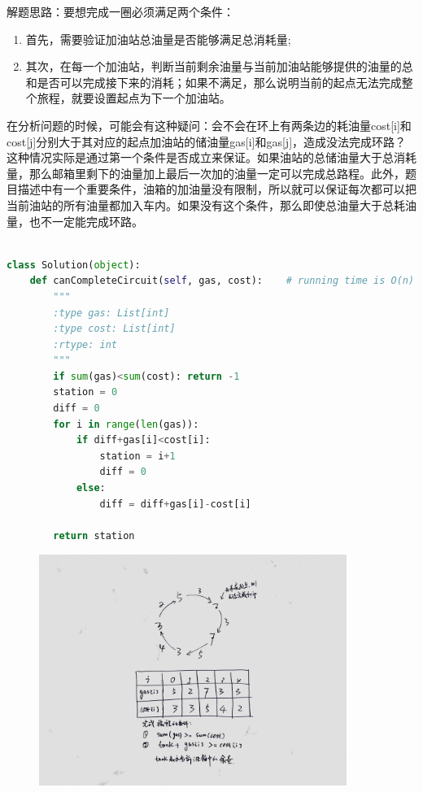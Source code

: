 \documentclass[a4paper,10pt]{article}
\begin{document}
\begin{CJK*}{UTF8}{gbsn}
\noindent 解题思路：要想完成一圈必须满足两个条件：
\begin{enumerate}
    \item 首先，需要验证加油站总油量是否能够满足总消耗量;
    \item 其次，在每一个加油站，判断当前剩余油量与当前加油站能够提供的油量的总和是否可以完成接下来的消耗；如果不满足，那么说明当前的起点无法完成整个旅程，就要设置起点为下一个加油站。
\end{enumerate}
在分析问题的时候，可能会有这种疑问：会不会在环上有两条边的耗油量cost[i]和cost[j]分别大于其对应的起点加油站的储油量gas[i]和gas[j]，造成没法完成环路？这种情况实际是通过第一个条件是否成立来保证。如果油站的总储油量大于总消耗量，那么邮箱里剩下的油量加上最后一次加的油量一定可以完成总路程。此外，题目描述中有一个重要条件，油箱的加油量没有限制，所以就可以保证每次都可以把当前油站的所有油量都加入车内。如果没有这个条件，那么即使总油量大于总耗油量，也不一定能完成环路。\\
\end{CJK*}


\begin{lstlisting}[language=Python, caption=Problem134. Gas Station]

class Solution(object):
    def canCompleteCircuit(self, gas, cost):    # running time is O(n)
        """
        :type gas: List[int]
        :type cost: List[int]
        :rtype: int
        """
        if sum(gas)<sum(cost): return -1
        station = 0
        diff = 0
        for i in range(len(gas)):
            if diff+gas[i]<cost[i]:
                station = i+1
                diff = 0
            else:
                diff = diff+gas[i]-cost[i]
        
        return station
\end{lstlisting}

\begin{figure}[h]
    \includegraphics[width=10cm]{leetcode134.jpg}
    \centering \\
\end{figure}
\end{document}
